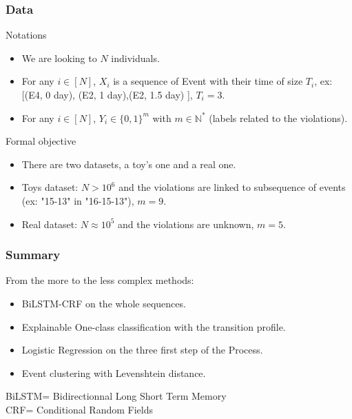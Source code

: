 \documentclass{beamer}
\begin{document}
\begin{frame}
		\frametitle{Data}
		\begin{block}{Notations}
			\begin{itemize}
                \item We are looking to $N$ individuals.
				\item For any $i\in [N]$, $X_i$ is a sequence of Event with their time of size $T_i$, ex: [(E4, 0 day), (E2, 1 day),(E2, 1.5 day) ], $T_i=3$.
                \item For any $i\in [N]$, $Y_i\in \{0,1\}^m$ with $m \in \mathbb{N}^*$ (labels related to the violations).
			\end{itemize}
		\end{block}
		\begin{exampleblock}{Formal objective}
		\begin{itemize}
				\item There are two datasets, a toy's one and a real one.
                \item  Toys dataset: $N>10^6$ and the violations are linked to subsequence of events (ex: "15-13" in "16-15-13"), $m=9$.
                \item  Real dataset: $N\approx 10^5$ and the violations are unknown, $m=5$.
			\end{itemize}
		\end{exampleblock}
\end{frame}


\begin{frame}
		\frametitle{Summary}
        From the more to the less complex methods:
		\begin{itemize}
		    \item BiLSTM-CRF on the whole sequences.
            \item Explainable One-class classification with the transition profile.
            \item Logistic Regression on the three first step of the Process.
            \item Event clustering with Levenshtein distance.
            
		\end{itemize}
  \vspace{5mm}
  BiLSTM= Bidirectionnal Long Short Term Memory\\
  CRF= Conditional Random Fields
\end{frame}
\end{document}
